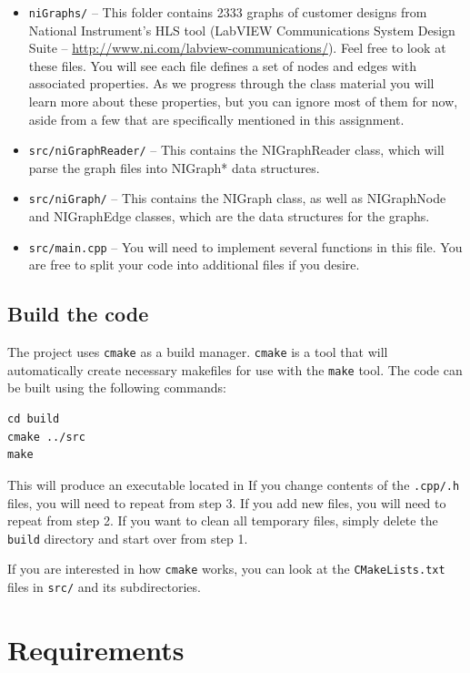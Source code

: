 \begin{itemize}
	\item {\tt niGraphs/} -- This folder contains 2333 graphs of customer designs from National Instrument's HLS tool (LabVIEW Communications System Design Suite -- \url{http://www.ni.com/labview-communications/}).  Feel free to look at these files.  You will see each file defines a set of nodes and edges with associated properties.  As we progress through the class material you will learn more about these properties, but you can ignore most of them for now, aside from a few that are specifically mentioned in this assignment.
	\item {\tt src/niGraphReader/} -- This contains the NIGraphReader class, which will parse the graph files into NIGraph* data structures.
	\item {\tt src/niGraph/} -- This contains the NIGraph class, as well as NIGraphNode and NIGraphEdge classes, which are the data structures for the graphs.
	\item {\tt src/main.cpp} -- You will need to implement several functions in this file.  You are free to split your code into additional files if you desire.
\end{itemize}

\subsection{Build the code}
The project uses {\tt cmake} as a build manager.  {\tt cmake} is a tool that will automatically create necessary makefiles for use with the {\tt make} tool.
The code can be built using the following commands:
\begin{lstlisting}
cd build
cmake ../src
make
\end{lstlisting}

This will produce an executable located in 
If you change contents of the {\tt .cpp/.h} files, you will need to repeat from step 3.  If you add new files, you will need to repeat from step 2.  If you want to clean all temporary files, simply delete the {\tt build} directory and start over from step 1.
	
If you are interested in how {\tt cmake} works, you can look at the {\tt CMakeLists.txt} files in {\tt src/} and its subdirectories.
	

\section{Requirements}

